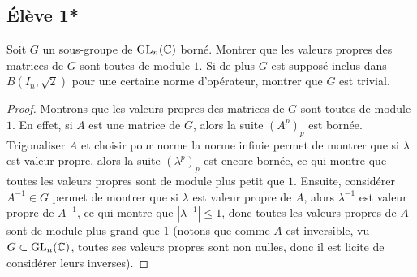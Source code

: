 \documentclass[10pt]{scrartcl}
\title{}
\author{}
\date{}
\begin{document}
    \subsection*{Élève 1*}
    \begin{exo}
        Soit $G$ un sous-groupe de $\operatorname{GL}_n(\operatorname{\mathbb C})$ borné. 
        Montrer que les valeurs propres des matrices de $G$ 
        sont toutes de module $1$. 
        Si de plus $G$ est supposé inclus dans $B(I_n,\sqrt2)$
        pour une certaine norme d'opérateur, montrer que $G$
        est trivial.
    \end{exo}

    \begin{proof}
        Montrons que les valeurs propres des matrices de $G$ sont toutes de module $1$. 
        En effet, si $A$ est une matrice de $G$, alors la suite $(A^p)_p$ est bornée. 
        Trigonaliser $A$ et choisir pour norme la norme infinie permet de montrer que si 
        $\lambda$ est valeur propre, alors la suite $(\lambda^p)_p$ est encore bornée,
        ce qui montre que toutes les valeurs propres sont de module plus petit que $1$.
        Ensuite, considérer $A^{-1}\in G$ permet de montrer que si $\lambda$ est valeur 
        propre de $A$, alors $\lambda^{-1}$ est valeur propre de $A^{-1}$, ce qui montre
        que $|\lambda^{-1}|\leq 1$, donc toutes les valeurs propres de $A$ sont de module 
        plus grand que $1$ (notons que comme $A$ est inversible, vu $G\subset \operatorname{GL}_n(\operatorname{\mathbb C})$, 
        toutes ses valeurs propres sont non nulles, donc il est licite de considérer 
        leurs inverses).


\end{proof}
\end{document}
